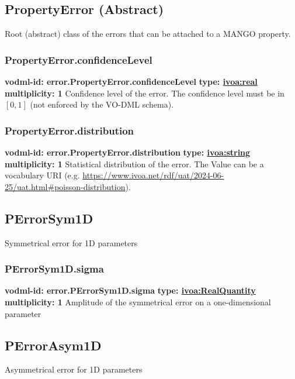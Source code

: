   \subsection{PropertyError (Abstract)}
    \label{sect:error.PropertyError}
    Root (abstract) class of the errors that can be attached to a MANGO property.

    \subsubsection{PropertyError.confidenceLevel}
    \textbf{vodml-id: error.PropertyError.confidenceLevel} \newline
    \textbf{type: \hyperref[sect:ivoa]{ivoa:real}} \newline
    \textbf{multiplicity: 1} \newline
    Confidence level of the error. The confidence level must be in $[0, 1]$ (not enforced by the VO-DML schema).

    \subsubsection{PropertyError.distribution}
    \textbf{vodml-id: error.PropertyError.distribution} \newline
    \textbf{type: \hyperref[sect:ivoa]{ivoa:string}} \newline
    \textbf{multiplicity: 1} \newline
    Statistical distribution of the error. The Value can be a vocabulary URI (e.g. \url{https://www.ivoa.net/rdf/uat/2024-06-25/uat.html#poisson-distribution}).

  \subsection{PErrorSym1D}
    \label{sect:error.PErrorSym1D}
    Symmetrical error for 1D parameters

    \subsubsection{PErrorSym1D.sigma}
    \textbf{vodml-id: error.PErrorSym1D.sigma} \newline
    \textbf{type: \hyperref[sect:ivoa]{ivoa:RealQuantity}} \newline
    \textbf{multiplicity: 1} \newline
    Amplitude of the symmetrical error on a one-dimensional parameter

  \subsection{PErrorAsym1D}
    \label{sect:error.PErrorAsym1D}
    Asymmetrical error for 1D parameters

